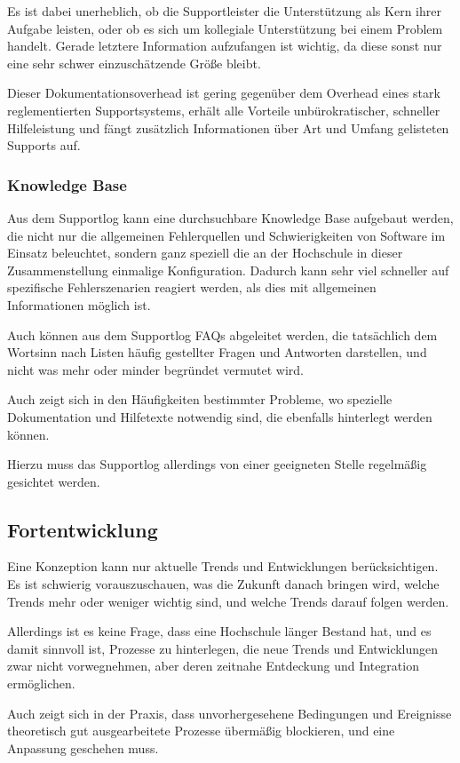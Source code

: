 Es ist dabei unerheblich, ob die Supportleister die Unterstützung als Kern ihrer Aufgabe leisten, oder ob es sich um kollegiale Unterstützung bei einem Problem handelt. Gerade letztere Information aufzufangen ist wichtig, da diese sonst nur eine sehr schwer einzuschätzende Größe bleibt.

Dieser Dokumentationsoverhead ist gering gegenüber dem Overhead eines stark reglementierten Supportsystems, erhält alle Vorteile unbürokratischer, schneller Hilfeleistung und fängt zusätzlich Informationen über Art und Umfang gelisteten Supports auf.

\subsubsection{Knowledge Base}
Aus dem Supportlog kann eine durchsuchbare Knowledge Base aufgebaut werden, die nicht nur die allgemeinen Fehlerquellen und Schwierigkeiten von Software im Einsatz beleuchtet, sondern ganz speziell die an der Hochschule in dieser Zusammenstellung einmalige Konfiguration.
Dadurch kann sehr viel schneller auf spezifische Fehlerszenarien reagiert werden, als dies mit allgemeinen Informationen möglich ist.

Auch können aus dem Supportlog FAQs abgeleitet werden, die tatsächlich dem Wortsinn nach Listen häufig gestellter Fragen und Antworten darstellen, und nicht was mehr oder minder begründet vermutet wird.

Auch zeigt sich in den Häufigkeiten bestimmter Probleme, wo spezielle Dokumentation und Hilfetexte notwendig sind, die ebenfalls hinterlegt werden können.

Hierzu muss das Supportlog allerdings von einer geeigneten Stelle regelmäßig gesichtet werden.

\subsection{Fortentwicklung}
Eine Konzeption kann nur aktuelle Trends und Entwicklungen berücksichtigen. Es ist schwierig vorauszuschauen, was die Zukunft danach bringen wird, welche Trends mehr oder weniger wichtig sind, und welche Trends darauf folgen werden.

Allerdings ist es keine Frage, dass eine Hochschule länger Bestand hat, und es damit sinnvoll ist, Prozesse zu hinterlegen, die neue Trends und Entwicklungen zwar nicht vorwegnehmen, aber deren zeitnahe Entdeckung und Integration ermöglichen.

Auch zeigt sich in der Praxis, dass unvorhergesehene Bedingungen und Ereignisse theoretisch gut ausgearbeitete Prozesse übermäßig blockieren, und eine Anpassung geschehen muss.


